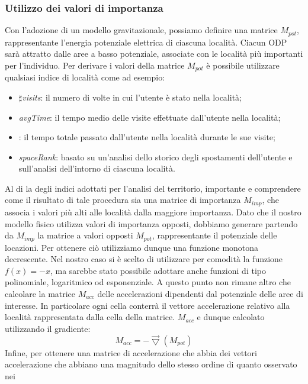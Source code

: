 \subsubsection{Utilizzo dei valori di importanza}
Con l'adozione di un modello gravitazionale, possiamo definire una matrice
$M_{pot}$, rappresentante l'energia potenziale elettrica di ciascuna localit\`a. Ciacun
ODP sar\`a attratto dalle aree a basso potenziale, associate con le localit\`a pi\`u
importanti per l'individuo.
Per derivare i valori della matrice $M_{pot}$ \`e possibile utilizzare qualsiasi indice di
localit\`a come ad esempio:
\begin{itemize}
\item $\sharp$\textit{visits}: il numero di volte in cui l'utente \`e stato nella localit\`a;
\item \textit{avgTime}: il tempo medio delle visite effettuate dall'utente nella localit\`a;
\item {}: il tempo totale passato dall'utente nella localit\`a durante le sue
visite;
\item \textit{spaceRank}: basato su un'analisi dello storico degli spostamenti dell'utente
e sull'analisi dell'intorno di ciascuna localit\`a.
\end{itemize}
Al di la degli indici adottati per l'analisi del territorio, importante e comprendere
come il risultato di tale procedura sia una matrice di importanza
$M_{imp}$, che associa i valori pi\`u alti alle localit\`a dalla maggiore importanza. Dato
che il nostro modello fisico utilizza valori di importanza opposti, dobbiamo
generare partendo da $M_{imp}$ la matrice a valori opposti $M_{pot}$, rappresentante il
potenziale delle locazioni. Per ottenere ci\`o utilizziamo dunque una funzione
monotona decrescente. Nel nostro caso si \`e scelto di utilizzare per comodit\`a
la funzione $f(x)=-x$, ma sarebbe stato possibile adottare anche funzioni di tipo
polinomiale, logaritmico od esponenziale. A questo punto non rimane altro che
calcolare la matrice $M_{acc}$ delle accelerazioni dipendenti dal potenziale delle aree
di interesse. In particolare ogni cella conterr\`a il vettore accelerazione relativo
alla localit\`a rappresentata dalla cella della matrice. $M_{acc}$ e dunque calcolato
utilizzando il gradiente:
\begin{equation}
M_{acc} = - \vec{\bigtriangledown}(M_{pot})
\end{equation}
Infine, per ottenere una matrice di accelerazione che abbia dei vettori accelerazione
che abbiano una magnitudo dello stesso ordine di quanto osservato nei
